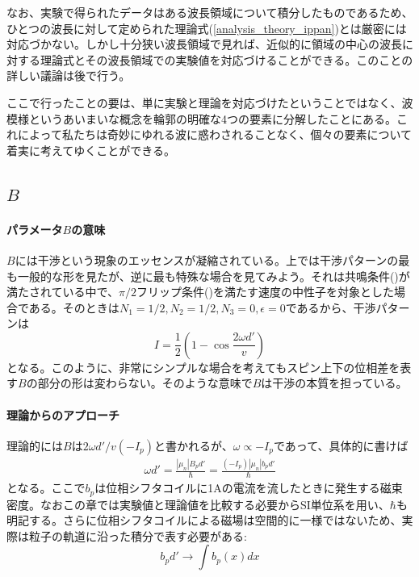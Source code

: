 なお、実験で得られたデータはある波長領域について積分したものであるため、ひとつの波長に対して定められた理論式(\ref{analysis_theory_ippan})とは厳密には対応づかない。しかし十分狭い波長領域で見れば、近似的に領域の中心の波長に対する理論式とその波長領域での実験値を対応づけることができる。このことの詳しい議論は後で行う。

ここで行ったことの要は、単に実験と理論を対応づけたということではなく、波模様というあいまいな概念を輪郭の明確な4つの要素に分解したことにある。これによって私たちは奇妙にゆれる波に惑わされることなく、個々の要素について着実に考えてゆくことができる。

\subsection{$B$}
\paragraph{パラメータ$B$の意味}
$B$には干渉という現象のエッセンスが凝縮されている。上では干渉パターンの最も一般的な形を見たが、逆に最も特殊な場合を見てみよう。それは共鳴条件()が満たされている中で、$\pi/2$フリップ条件()を満たす速度の中性子を対象とした場合である。そのときは$N_1=1/2,N_2=1/2,N_3=0,\epsilon=0$であるから、干渉パターンは
\begin{equation}
I=\frac{1}{2}\left(1-\cos\frac{2\omega d'}{v}\right) \label{analysis_theory_simple}
\end{equation}
となる。このように、非常にシンプルな場合を考えてもスピン上下の位相差を表す$B$の部分の形は変わらない。そのような意味で$B$は干渉の本質を担っている。

\paragraph{理論からのアプローチ}
理論的には$B$は$2\omega d'/v(-I_p)$と書かれるが、$\omega \propto -I_p$であって、具体的に書けば
\begin{align}
\omega d'=\frac{|\mu_n|B_p d'}{\hbar}=\frac{(-I_p)|\mu_n| b_p d'}{\hbar}
\end{align}
となる。ここで$b_p$は位相シフタコイルに1Aの電流を流したときに発生する磁束密度。なおこの章では実験値と理論値を比較する必要からSI単位系を用い、$\hbar$も明記する。さらに位相シフタコイルによる磁場は空間的に一様ではないため、実際は粒子の軌道に沿った積分で表す必要がある:
\begin{equation}
b_p d' \rightarrow \int b_p(x) dx
\end{equation}

